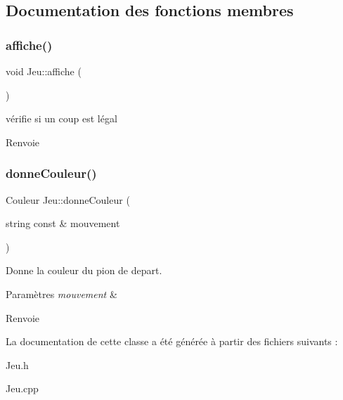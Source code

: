 \subsection{Documentation des fonctions membres}
\mbox{\label{classJeu_a7931f8054847abc19e33e73967a3807e}} 
\subsubsection{\texorpdfstring{affiche()}{affiche()}}
{\footnotesize\ttfamily void Jeu\+::affiche (\begin{DoxyParamCaption}{ }\end{DoxyParamCaption})}



vérifie si un coup est légal 

\begin{DoxyReturn}{Renvoie}

\end{DoxyReturn}
\mbox{\label{classJeu_a3cc5aa35c3ee56ab4bbf6f8be660963c}} 
\subsubsection{\texorpdfstring{donne\+Couleur()}{donneCouleur()}}
{\footnotesize\ttfamily Couleur Jeu\+::donne\+Couleur (\begin{DoxyParamCaption}\item[{string const \&}]{mouvement }\end{DoxyParamCaption})}



Donne la couleur du pion de depart. 


\begin{DoxyParams}{Paramètres}
{\em mouvement} & \\
\hline
\end{DoxyParams}
\begin{DoxyReturn}{Renvoie}

\end{DoxyReturn}


La documentation de cette classe a été générée à partir des fichiers suivants \+:\begin{DoxyCompactItemize}
\item 
Jeu.\+h\item 
Jeu.\+cpp\end{DoxyCompactItemize}

